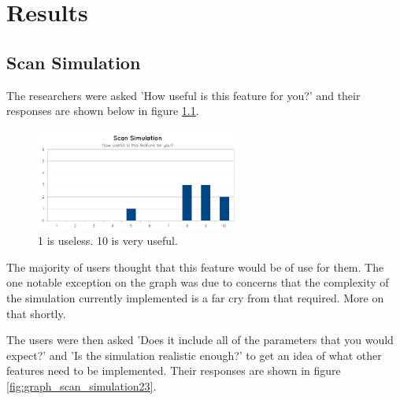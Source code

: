 \chapter{Results}


\section{Scan Simulation}
The researchers were asked 'How useful is this feature for you?' and their responses are shown below in figure \ref{fig:graph_scansimulation_1}.

\begin{figure}[h]
    \centering
	\includegraphics[width=0.6\textwidth]{images/evaluation/graph_scan_simulation_1.png}
    \caption{1 is useless. 10 is very useful.}\label{fig:graph_scansimulation_1}
\end{figure}

The majority of users thought that this feature would be of use for them. The one notable exception on the graph was due to concerns that the complexity of the simulation currently implemented is a far cry from that required. More on that shortly.

The users were then asked 'Does it include all of the parameters that you would expect?' and 'Is the simulation realistic enough?' to get an idea of what other features need to be implemented. Their responses are shown in figure \ref{fig:graph_scan_simulation23}.

